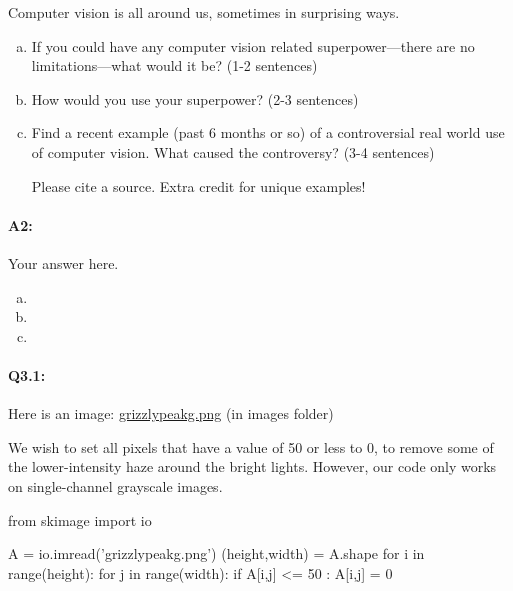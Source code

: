 \documentclass[11pt]{article}
\begin{document}
Computer vision is all around us, sometimes in surprising ways.
\begin{enumerate}[(a)]

\item
If you could have any computer vision related superpower---there are no limitations---what would it be? (1-2 sentences)

\item
How would you use your superpower? (2-3 sentences)

\item Find a recent example (past 6 months or so) of a controversial real world use of computer vision. What caused the controversy? (3-4 sentences)

Please cite a source. Extra credit for unique examples!
\end{enumerate}

\paragraph{A2:} Your answer here.

\begin{enumerate}[(a)]

\item

\item

\item

\end{enumerate}



\pagebreak
\paragraph{Q3.1:} Here is an image: \href{run:images/grizzlypeakg.png}{grizzlypeakg.png} (in images folder)

We wish to set all pixels that have a value of 50 or less to 0, to remove some of the lower-intensity haze around the bright lights. However, our code only works on single-channel grayscale images.

\begin{python}
from skimage import io

A = io.imread('grizzlypeakg.png')
(height,width) = A.shape
for i in range(height):
    for j in range(width):
        if A[i,j] <= 50 :
            A[i,j] = 0
\end{python}
\end{document}
